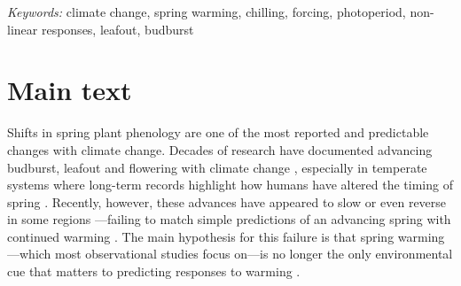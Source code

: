 \documentclass[11pt,letter]{article}
\begin{document}

\noindent \emph{Keywords:} climate change, spring warming, chilling, forcing, photoperiod, non-linear responses, leafout, budburst\\

\newpage
\section{Main text} %
Shifts in spring plant phenology are one of the most reported and predictable changes with climate change. Decades of research have documented advancing budburst, leafout and flowering with climate change \citep{delpierre2009, yu2010,Ellwood2012,jochner2013,hereford2017}, especially in temperate systems where long-term records highlight how humans have altered the timing of spring \citep{Schwartz:1997nn,menzel2006}. Recently, however, these advances have appeared to slow \citep{fu2015} or even reverse in some regions \citep{yu2010}---failing to match simple predictions of an advancing spring with continued warming \citep{Ellwood2012}. The main hypothesis for this failure is that spring warming---which most observational studies focus on---is no longer the only environmental cue that matters to predicting responses to warming \citep{chuine2016,gauzere2019}.\\ 
\end{document}
